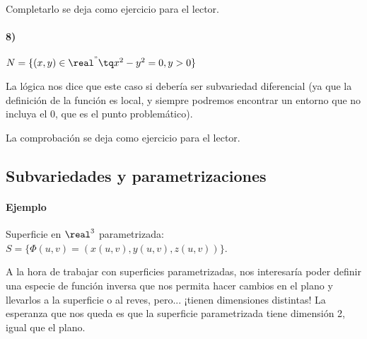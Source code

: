  Completarlo se deja como ejercicio para el lector.

\paragraph{8)}

$N = \{(x,y)\in \real^" \tq x^2-y^2 = 0, y>0\}$

La lógica nos dice que este caso si debería ser subvariedad diferencial (ya que la definición de la función es local, y siempre podremos encontrar un entorno que no incluya el 0, que es el punto problemático).

La comprobación se deja como ejercicio para el lector.

\subsection{Subvariedades y parametrizaciones}
\paragraph{Ejemplo} Superficie en $\real^3$ parametrizada: $S = \{\Phi(u,v) = (x(u,v),y(u,v),z(u,v))\}$.

A la hora de trabajar con superficies parametrizadas, nos interesaría poder definir una especie de función inversa que nos permita hacer cambios en el plano y llevarlos a la superficie o al reves, pero... ¡tienen dimensiones distintas! La esperanza que nos queda es que la superficie parametrizada tiene dimensión 2, igual que el plano.



